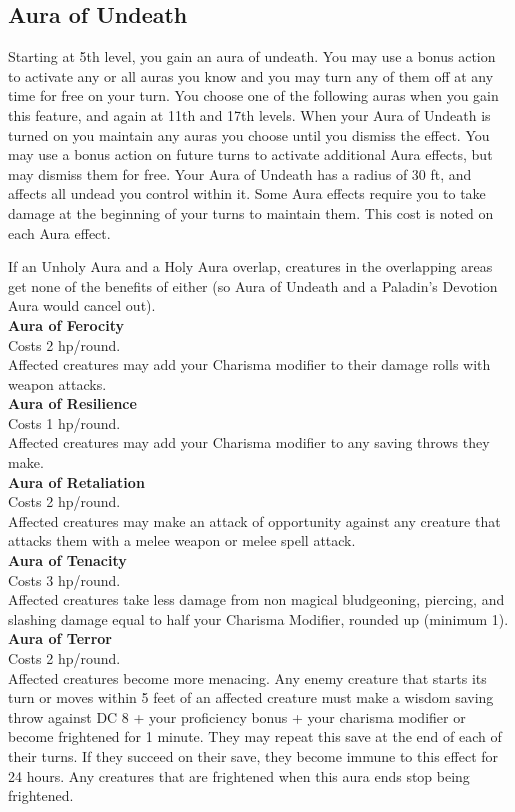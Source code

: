 \subsection{Aura of Undeath}
Starting at 5th level, you gain an aura of undeath. You may use a bonus action to activate any or all auras you know and you may turn any of them off at any time for free on your turn.
You choose one of the following auras when you gain this feature, and again at 11th and 17th levels. When your Aura of Undeath is turned on you maintain any auras you choose until you dismiss the effect. You may use a bonus action on future turns to activate additional Aura effects, but may dismiss them for free. Your Aura of Undeath has a radius of 30 ft, and affects all undead you control within it. Some Aura effects require you to take damage at the beginning of your turns to maintain them. This cost is noted on each Aura effect.

If an Unholy Aura and a Holy Aura overlap, creatures in the overlapping areas get none of the benefits of either (so Aura of Undeath and a Paladin’s Devotion Aura would cancel out).\\

\textbf{Aura of Ferocity}\\
Costs 2 hp/round.\\
Affected creatures may add your Charisma modifier to their damage rolls with weapon attacks.\\

\textbf{Aura of Resilience}\\
Costs 1 hp/round.\\
Affected creatures may add your Charisma modifier to any saving throws they make.\\

\textbf{Aura of Retaliation}\\
Costs 2 hp/round.\\
Affected creatures may make an attack of opportunity against any creature that attacks them with a melee weapon or melee spell attack.\\

\textbf{Aura of Tenacity}\\
Costs 3 hp/round.\\
Affected creatures take less damage from non magical bludgeoning, piercing, and slashing damage equal to half your Charisma Modifier, rounded up (minimum 1).\\

\textbf{Aura of Terror}\\
Costs 2 hp/round.\\
Affected creatures become more menacing. Any enemy creature that starts its turn or moves within 5 feet of an affected creature must make a wisdom saving throw against DC 8 + your proficiency bonus + your charisma modifier or become frightened for 1 minute. They may repeat this save at the end of each of their turns. If they succeed on their save, they become immune to this effect for 24 hours. Any creatures that are frightened when this aura ends stop being frightened.

